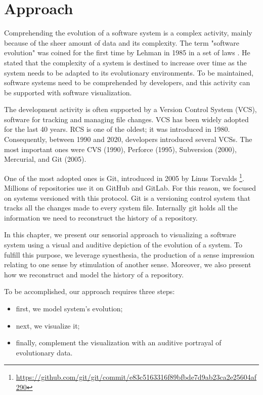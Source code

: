 
\chapter[Approach]{Approach}
\graphicspath{ {images/approach} }

Comprehending the evolution of a software system is a complex activity, mainly because of the sheer amount of data and its complexity. 
The term "software evolution" was coined for the first time by Lehman in 1985 in a set of laws \cite{Lehman1985}.
He stated that the complexity of a system is destined to increase over time as the system needs to be adapted to its evolutionary environments. 
To be maintained, software systems need to be comprehended by developers, and this activity can be supported with software visualization. 

The development activity is often supported by a Version Control System (VCS), software for tracking and managing file changes. VCS has been widely adopted for the last 40 years. RCS is one of the oldest; it was introduced in 1980. Consequently, between 1990 and 2020, developers introduced several VCSs. The most important ones were CVS (1990), Perforce (1995), Subversion (2000), Mercurial, and Git (2005).

One of the most adopted ones is Git, introduced in 2005 by Linus Torvalds \footnote{\url{https://github.com/git/git/commit/e83c5163316f89bfbde7d9ab23ca2e25604af290}}. Millions of repositories use it on GitHub and GitLab. 
For this reason, we focused on systems versioned with this protocol.
Git is a versioning control system that tracks all the changes made to every system file. 
Internally git holds all the information we need to reconstruct the history of a repository. 

In this chapter, we present our sensorial approach to visualizing a software system using a visual and auditive depiction of the evolution of a system. 
To fulfill this purpose, we leverage synesthesia, the production of a sense impression relating to one sense by stimulation of another sense.
Moreover, we also present how we reconstruct and model the history of a repository. 

To be accomplished, our approach requires three steps: 
\begin{itemize}
    \item first, we model system's evolution; 
    \item next, we visualize it;
    \item finally, complement the visualization with an auditive portrayal of evolutionary data. 
\end{itemize}


